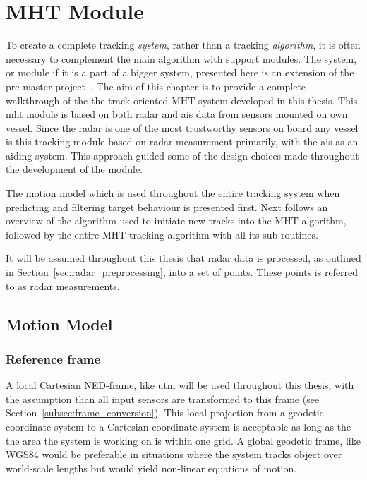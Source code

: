 
\chapter{MHT Module}\label{chapter:mht-module}
To create a complete tracking \emph{system}, rather than a tracking \emph{\gls{algorithm}}, it is often necessary to complement the main algorithm with support modules. The system, or module if it is a part of a bigger system, presented here is an extension of the pre master project~\cite{Liland_2017}. The aim of this chapter is to provide a complete walkthrough of the the track oriented MHT system developed in this thesis. This \gls{mht} module is based on both radar and \gls{ais} data from sensors mounted on own vessel. Since the radar is one of the most trustworthy sensors on board any vessel is this tracking module based on radar measurement primarily, with the \gls{ais} as an aiding system. This approach guided some of the design choices made throughout the development of the module. 

The motion model which is used throughout the entire tracking system when predicting and filtering target behaviour is presented first. Next follows an overview of the algorithm used to initiate new tracks into the MHT algorithm, followed by the entire MHT tracking algorithm with all its sub-routines.

It will be assumed throughout this thesis that radar data is processed, as outlined in Section~\ref{sec:radar_preprocessing}, into a set of points. These points is referred to as radar measurements.

\section{Motion Model}\label{sec:motion-model}
\subsection{Reference frame}
A local Cartesian NED-frame, like \gls{utm} will be used throughout this thesis, with the assumption than all input sensors are transformed to this frame (see Section~\ref{subsec:frame_conversion}). This local projection from a geodetic coordinate system to a Cartesian coordinate system is acceptable as long as the the area the system is working on is within one grid. A global geodetic frame, like WGS84 would be preferable in situations where the system tracks object over world-scale lengths but would yield non-linear equations of motion.

